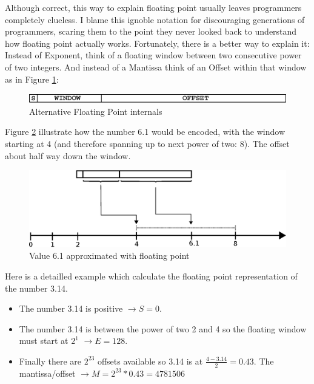 \documentclass[book.tex]{subfiles}
\begin{document}
\bigskip  
Although correct, this way to explain floating point usually leaves programmers completely clueless. I blame this ignoble notation for discouraging generations of programmers, scaring them to the point they never looked back to understand how floating point actually works. Fortunately, there is a better way to explain it: Instead of Exponent, think of a floating window between two consecutive power of two integers. And instead of a Mantissa think of an Offset within that window as in Figure \ref{fig:fp_internals}:
  
\begin{figure}[H]
\centering
\includegraphics[scale=0.4]{imgs/floating_point_intuitive.eps}
\caption{Alternative Floating Point internals}
\label{fig:fp_internals}
\end{figure}
  \bigskip  

Figure \ref{fig:fp_internals_window} illustrate how the number 6.1 would be encoded, with the window starting at 4 (and therefore spanning up to next power of two: 8). The offset about half way down the window.

\begin{figure}[H]
\centering
\includegraphics[scale=0.7]{imgs/floating_point_window.eps}

\caption{Value 6.1 approximated with floating point}
\label{fig:fp_internals_window}
\end{figure}
  \bigskip
  
Here is a detailled example which calculate the floating point representation of the number 3.14.
\begin{itemize}
 \item The number 3.14 is positive  $\rightarrow S=0$.
 \item The number 3.14 is between the power of two 2 and 4 so the floating window must start at $2^1$  $\rightarrow E=128$.
 \item Finally there are $2^{23}$ offsets available so 3.14 is at $\frac{4-3.14}{2} = 0.43 $. The mantissa/offset $\rightarrow M = 2^{23}*0.43 = 4781506$
\end{itemize}
\end{document}

